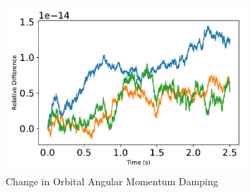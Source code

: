 \begin{figure}[htbp]\centerline{\includegraphics[width=0.8\textwidth]{AutoTeX/ChangeInOrbitalAngularMomentumDamping}}\caption{Change in Orbital Angular Momentum Damping}\label{fig:ChangeInOrbitalAngularMomentumDamping}\end{figure}